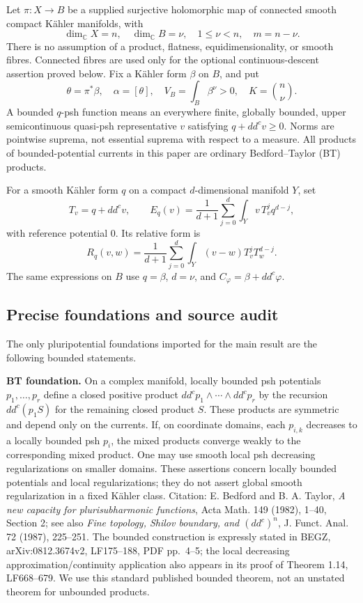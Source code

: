 \documentclass[
  11pt,
]{article}
\begin{document}
Let \(\pi:X\longrightarrow B\) be a supplied surjective holomorphic map
of connected smooth compact Kähler manifolds, with
\[\dim_{\mathbb C}X=n,\quad\dim_{\mathbb C}B=\nu,
\quad 1\leq\nu<n,\quad m=n-\nu.\] There is no assumption of a product,
flatness, equidimensionality, or smooth fibres. Connected fibres are
used only for the optional continuous-descent assertion proved below.
Fix a Kähler form \(\beta\) on \(B\), and put
\[\theta=\pi^*\beta,\quad \alpha=[\theta],\quad
V_B=\int_B\beta^\nu>0,\quad K=\binom n\nu.\] A bounded \(q\)-psh
function means an everywhere finite, globally bounded, upper
semicontinuous quasi-psh representative \(v\) satisfying
\(q+dd^cv\geq0\). Norms are pointwise suprema, not essential suprema
with respect to a measure. All products of bounded-potential currents in
this paper are ordinary Bedford--Taylor (BT) products.

For a smooth Kähler form \(q\) on a compact \(d\)-dimensional manifold
\(Y\), set \[T_v=q+dd^cv,\qquad
E_q(v)=\frac1{d+1}\sum_{j=0}^d\int_Yv\,T_v^j q^{d-j},\] with reference
potential \(0\). Its relative form is \[R_q(v,w)=\frac1{d+1}\sum_{j=0}^d
\int_Y(v-w)T_v^jT_w^{d-j}.\] The same expressions on \(B\) use
\(q=\beta\), \(d=\nu\), and \(C_\varphi=\beta+dd^c\varphi\).

\subsection{Precise foundations and source
audit}\label{precise-foundations-and-source-audit}

The only pluripotential foundations imported for the main result are the
following bounded statements.

\textbf{BT foundation.} On a complex manifold, locally bounded psh
potentials \(p_1,\ldots,p_r\) define a closed positive product
\(dd^cp_1\wedge\cdots\wedge dd^cp_r\) by the recursion \(dd^c(p_1 S)\)
for the remaining closed product \(S\). These products are symmetric and
depend only on the currents. If, on coordinate domains, each \(p_{i,k}\)
decreases to a locally bounded psh \(p_i\), the mixed products converge
weakly to the corresponding mixed product. One may use smooth local psh
decreasing regularizations on smaller domains. These assertions concern
locally bounded potentials and local regularizations; they do not assert
global smooth regularization in a fixed Kähler class. Citation: E.
Bedford and B. A. Taylor, \emph{A new capacity for plurisubharmonic
functions}, Acta Math. 149 (1982), 1--40, Section 2; see also \emph{Fine
topology, Shilov boundary, and \((dd^c)^n\)}, J. Funct. Anal. 72 (1987),
225--251. The bounded construction is expressly stated in BEGZ,
arXiv:0812.3674v2, LF175--188, PDF pp.~4--5; the local decreasing
approximation/continuity application also appears in its proof of
Theorem 1.14, LF668--679. We use this standard published bounded
theorem, not an unstated theorem for unbounded products.
\end{document}
